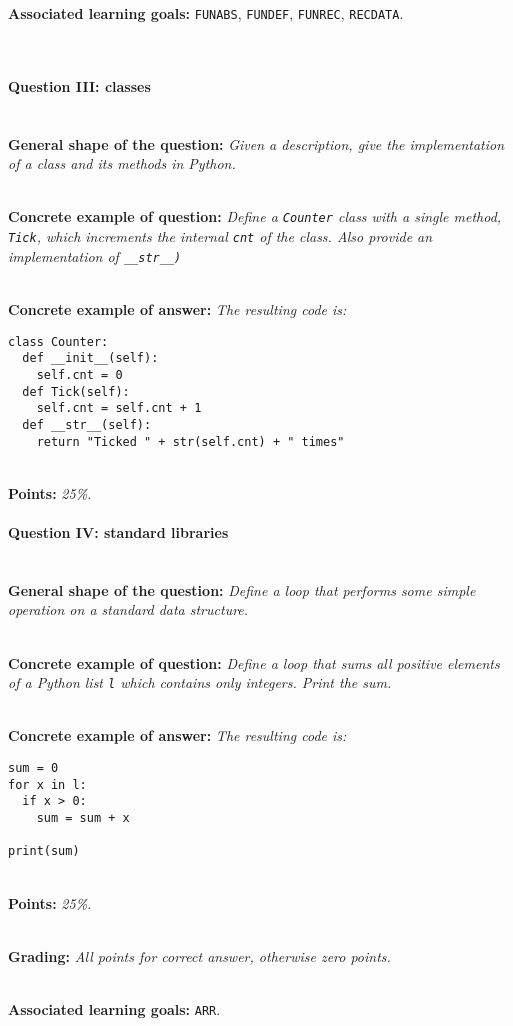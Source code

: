 \documentclass[10pt,a4paper]{article}
\begin{document}
\textbf{Associated learning goals:} \texttt{FUNABS}, \texttt{FUNDEF}, \texttt{FUNREC}, \texttt{RECDATA}.

\ \\ 

\paragraph{Question III: classes} \ \\

\textbf{General shape of the question:} \textit{Given a description, give the implementation of a class and its methods in Python.}

\ \\ 

\textbf{Concrete example of question:} \textit{Define a \texttt{Counter} class with a single method, \texttt{Tick}, which increments the internal \texttt{cnt} of the class. Also provide an implementation of \texttt{\_\_str\_\_)}}

\ \\ 

\textbf{Concrete example of answer:} \textit{The resulting code is:}

\begin{lstlisting}
class Counter:
  def __init__(self):
    self.cnt = 0
  def Tick(self):
    self.cnt = self.cnt + 1
  def __str__(self):
    return "Ticked " + str(self.cnt) + " times"
\end{lstlisting}

\ \\ 

\textbf{Points:} \textit{25\%.}

\paragraph{Question IV: standard libraries} \ \\

\textbf{General shape of the question:} \textit{Define a loop that performs some simple operation on a standard data structure.}

\ \\ 

\textbf{Concrete example of question:} \textit{Define a loop that sums all positive elements of a Python list \texttt{l} which contains only integers. Print the sum.}

\ \\ 

\textbf{Concrete example of answer:} \textit{The resulting code is:}

\begin{lstlisting}
sum = 0
for x in l:
  if x > 0:
    sum = sum + x

print(sum)
\end{lstlisting}

\ \\ 

\textbf{Points:} \textit{25\%.}

\ \\ 

\textbf{Grading:} \textit{All points for correct answer, otherwise zero points.}

\ \\ 

\textbf{Associated learning goals:} \texttt{ARR}.

\ \\ 
\end{document}
